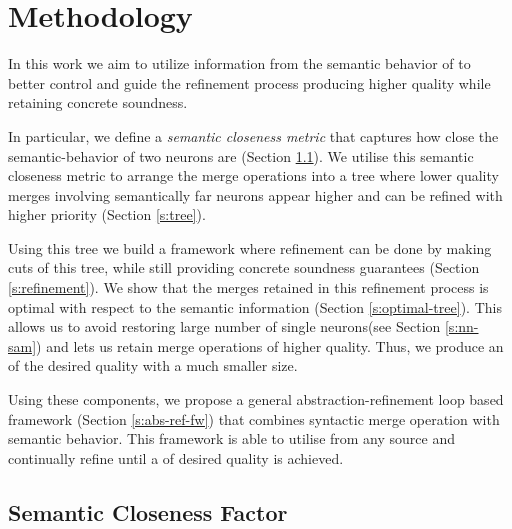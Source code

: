 \section{Methodology}
\label{s:semantic-closeness}

In this work we aim to utilize information from the semantic behavior of \cnc to
better control and guide the refinement process producing higher quality \abs
while retaining concrete soundness. 

In particular, we define a \textit{semantic
closeness metric} that captures how close the semantic-behavior of two 
neurons are (Section \ref{s:semantic-closeness}). We utilise this semantic
closeness metric to arrange the merge
operations into a tree where lower quality merges involving semantically far
neurons appear higher and can be refined with higher priority (Section
\ref{s:tree}). 

Using this tree we build a framework where refinement can
be done by making cuts of this tree, while still providing concrete soundness
guarantees (Section \ref{s:refinement}). We show that
the merges retained in this refinement process is optimal with respect to the
semantic information (Section \ref{s:optimal-tree}).
This allows us to avoid restoring large number of single neurons(see Section
\ref{s:nn-sam}) and lets us retain merge operations of higher quality. Thus, we
produce an \abs of the desired quality with a much smaller size. 



Using these components, we propose a general abstraction-refinement loop based
framework (Section \ref{s:abs-ref-fw}) that combines syntactic merge operation
with semantic behavior. This framework is able to utilise \gencex from any
source and continually refine until a \abs of desired quality is achieved.

\subsection{Semantic Closeness Factor}
\label{s:semantic-closeness}

